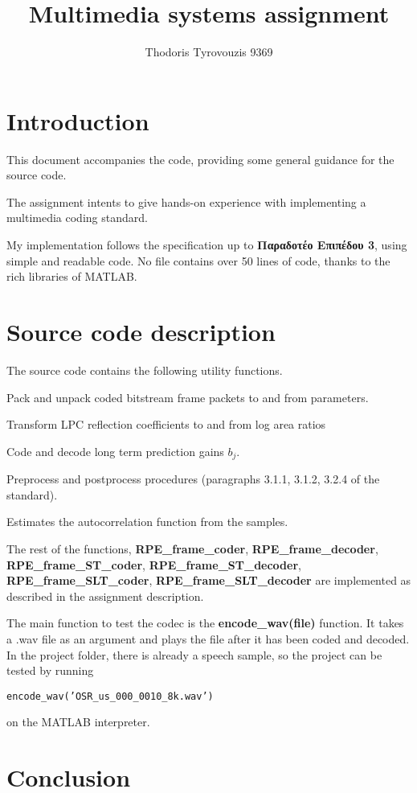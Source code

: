 \documentclass[]{article}
\title{Multimedia systems assignment}
\author{Thodoris Tyrovouzis 9369}
\begin{document}
\maketitle

\section{Introduction}
This document accompanies the code, providing some general guidance for the source code.

The assignment intents to give hands-on experience with implementing a multimedia coding standard.

My implementation follows the specification up to \textbf{\textgreek{Παραδοτέο Επιπέδου 3}}, using simple and readable code. No file contains over 50 lines of code, thanks to the rich libraries of MATLAB.

\section{Source code description}
The source code contains the following utility functions.

\begin{description}[align=myparleft]
	\item[packFrmBitStrm, unpackFrmBitStrm] Pack and unpack coded bitstream frame packets to and from parameters.
	\item[lar, lar\_inv] Transform LPC reflection coefficients to and from log area ratios
	\item[LTP\_gain\_code, LTP\_gain\_decode] Code and decode long term prediction gains $b_j$.
	\item[preproc, postproc] Preprocess and postprocess procedures (paragraphs 3.1.1, 3.1.2, 3.2.4 of the standard).
	\item[acf] Estimates the autocorrelation function from the samples.
\end{description}

The rest of the functions, \textbf{RPE\_frame\_coder}, \textbf{RPE\_frame\_decoder}, \textbf{RPE\_frame\_ST\_coder}, \textbf{RPE\_frame\_ST\_decoder}, \textbf{RPE\_frame\_SLT\_coder}, \textbf{RPE\_frame\_SLT\_decoder} are implemented as described in the assignment description.

The main function to test the codec is the \textbf{encode\_wav(file)} function. It takes a .wav file as an argument and plays the file after it has been coded and decoded. In the project folder, there is already a speech sample, so the project can be tested by running

\begin{center}
	\texttt{encode\_wav('OSR\_us\_000\_0010\_8k.wav')}
\end{center}

on the MATLAB interpreter.

\section{Conclusion}


\printbibliography
\end{document}
